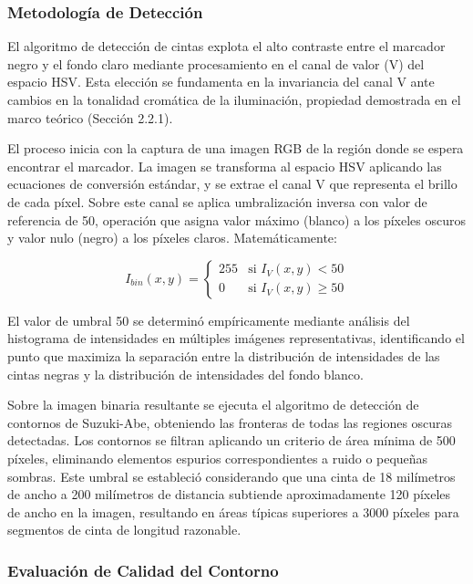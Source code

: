 \subsubsection{Metodología de Detección}

El algoritmo de detección de cintas explota el alto contraste entre el marcador negro y el fondo claro mediante procesamiento en el canal de valor (V) del espacio HSV. Esta elección se fundamenta en la invariancia del canal V ante cambios en la tonalidad cromática de la iluminación, propiedad demostrada en el marco teórico (Sección 2.2.1).

El proceso inicia con la captura de una imagen RGB de la región donde se espera encontrar el marcador. La imagen se transforma al espacio HSV aplicando las ecuaciones de conversión estándar, y se extrae el canal V que representa el brillo de cada píxel. Sobre este canal se aplica umbralización inversa con valor de referencia de 50, operación que asigna valor máximo (blanco) a los píxeles oscuros y valor nulo (negro) a los píxeles claros. Matemáticamente:

\begin{equation}
I_{bin}(x,y) = \begin{cases}
255 & \text{si } I_V(x,y) < 50 \\
0 & \text{si } I_V(x,y) \geq 50
\end{cases}
\end{equation}

El valor de umbral 50 se determinó empíricamente mediante análisis del histograma de intensidades en múltiples imágenes representativas, identificando el punto que maximiza la separación entre la distribución de intensidades de las cintas negras y la distribución de intensidades del fondo blanco.

Sobre la imagen binaria resultante se ejecuta el algoritmo de detección de contornos de Suzuki-Abe, obteniendo las fronteras de todas las regiones oscuras detectadas. Los contornos se filtran aplicando un criterio de área mínima de 500 píxeles, eliminando elementos espurios correspondientes a ruido o pequeñas sombras. Este umbral se estableció considerando que una cinta de 18 milímetros de ancho a 200 milímetros de distancia subtiende aproximadamente 120 píxeles de ancho en la imagen, resultando en áreas típicas superiores a 3000 píxeles para segmentos de cinta de longitud razonable.

\subsubsection{Evaluación de Calidad del Contorno}

